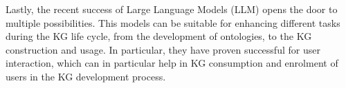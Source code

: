 Lastly, the recent success of Large Language Models (LLM) opens the door to multiple possibilities. This models can be suitable for enhancing different tasks during the KG life cycle, from the development of ontologies, to the KG construction and usage. In particular, they have proven successful for user interaction, which can in particular help in KG consumption and enrolment of users in the KG development process.



